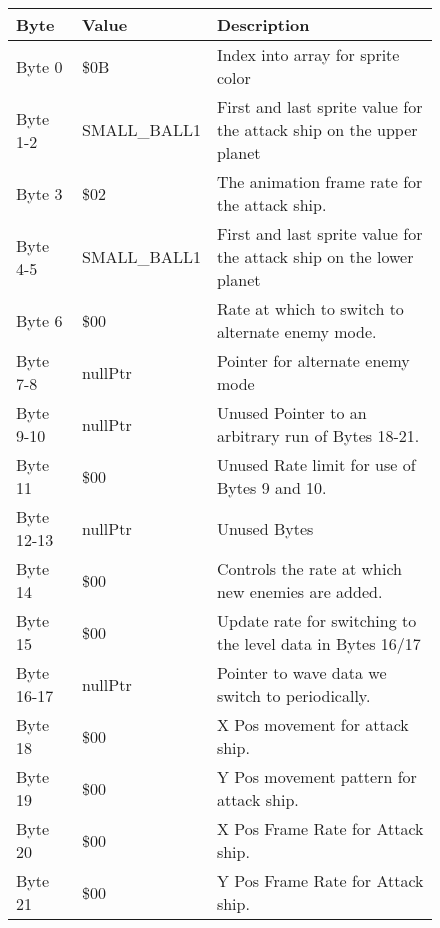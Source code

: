 \begin{figure}[H]
{\begin{adjustbox}{width=12cm}
\begin{tabular}{lll}
\toprule
 Byte       & Value                & Description                                                         \\
\midrule
 Byte 0     & \$0B                  & Index into array for sprite color                                   \\
 Byte 1-2   & SMALL\_BALL1          & First and last sprite value for the attack ship on the upper planet \\
 Byte 3     & \$02                  & The animation frame rate for the attack ship.                       \\
 Byte 4-5   & SMALL\_BALL1          & First and last sprite value for the attack ship on the lower planet \\
 Byte 6     & \$00                  & Rate at which to switch to alternate enemy mode.                    \\
 Byte 7-8   & nullPtr              & Pointer for alternate enemy mode                                    \\
 Byte 9-10  & nullPtr              & Unused Pointer to an arbitrary run of Bytes 18-21.                  \\
 Byte 11    & \$00                  & Unused Rate limit for use of Bytes 9 and 10.                        \\
 Byte 12-13 & nullPtr              & Unused Bytes                                                        \\
 Byte 14    & \$00                  & Controls the rate at which new enemies are added.                   \\
 Byte 15    & \$00                  & Update rate for switching to the level data in Bytes 16/17          \\
 Byte 16-17 & nullPtr              & Pointer to wave data we switch to periodically.                     \\
 Byte 18    & \$00                  & X Pos movement for attack ship.                                     \\
 Byte 19    & \$00                  & Y Pos movement pattern for attack ship.                             \\
 Byte 20    & \$00                  & X Pos Frame Rate for Attack ship.                                   \\
 Byte 21    & \$00                  & Y Pos Frame Rate for Attack ship.                                   \\

\end{tabular}
\end{adjustbox}}
\end{figure}
